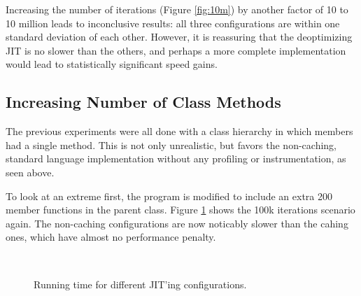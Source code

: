 \documentclass[journal,comsoc]{IEEEtran}
\begin{document}
	Increasing the number of iterations (Figure \ref{fig:10m}) by another factor of 10 to 10 million leads to inconclusive results: all three configurations are within one standard deviation of each other. However, it is reassuring that the deoptimizing JIT is no slower than the others, and perhaps a more complete implementation would lead to statistically significant speed gains.
	
	\subsection{Increasing Number of Class Methods}
	The previous experiments were all done with a class hierarchy in which members had a single method. This is not only unrealistic, but favors the non-caching, standard language implementation without any profiling or instrumentation, as seen above.
	
	To look at an extreme first, the program is modified to include an extra 200 member functions in the parent class. Figure \ref{fig:200methods} shows the 100k iterations scenario again. The non-caching configurations are now noticably slower than the cahing ones, which have almost no performance penalty.
	
	\begin{figure}[htb]

	\caption{Running time for different JIT'ing configurations.}
	\\
		\label{fig:200methods}
	\end{figure}
			
\end{document}
